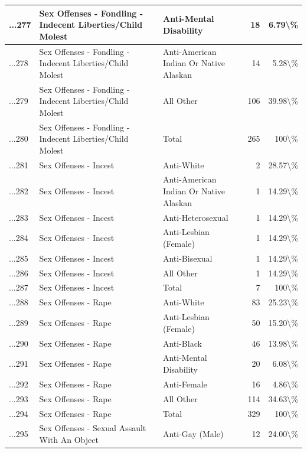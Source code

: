 \documentclass[
]{krantz}
\begin{document}
\begin{longtable}[t]{l|l|l|r|r}
\hline
...277 & Sex Offenses - Fondling - Indecent Liberties/Child Molest & Anti-Mental Disability & 18 & 6.79\textbackslash{}\%\\
\hline
...278 & Sex Offenses - Fondling - Indecent Liberties/Child Molest & Anti-American Indian Or Native Alaskan & 14 & 5.28\textbackslash{}\%\\
\hline
...279 & Sex Offenses - Fondling - Indecent Liberties/Child Molest & All Other & 106 & 39.98\textbackslash{}\%\\
\hline
...280 & Sex Offenses - Fondling - Indecent Liberties/Child Molest & Total & 265 & 100\textbackslash{}\%\\
\hline
...281 & Sex Offenses - Incest & Anti-White & 2 & 28.57\textbackslash{}\%\\
\hline
...282 & Sex Offenses - Incest & Anti-American Indian Or Native Alaskan & 1 & 14.29\textbackslash{}\%\\
\hline
...283 & Sex Offenses - Incest & Anti-Heterosexual & 1 & 14.29\textbackslash{}\%\\
\hline
...284 & Sex Offenses - Incest & Anti-Lesbian (Female) & 1 & 14.29\textbackslash{}\%\\
\hline
...285 & Sex Offenses - Incest & Anti-Bisexual & 1 & 14.29\textbackslash{}\%\\
\hline
...286 & Sex Offenses - Incest & All Other & 1 & 14.29\textbackslash{}\%\\
\hline
...287 & Sex Offenses - Incest & Total & 7 & 100\textbackslash{}\%\\
\hline
...288 & Sex Offenses - Rape & Anti-White & 83 & 25.23\textbackslash{}\%\\
\hline
...289 & Sex Offenses - Rape & Anti-Lesbian (Female) & 50 & 15.20\textbackslash{}\%\\
\hline
...290 & Sex Offenses - Rape & Anti-Black & 46 & 13.98\textbackslash{}\%\\
\hline
...291 & Sex Offenses - Rape & Anti-Mental Disability & 20 & 6.08\textbackslash{}\%\\
\hline
...292 & Sex Offenses - Rape & Anti-Female & 16 & 4.86\textbackslash{}\%\\
\hline
...293 & Sex Offenses - Rape & All Other & 114 & 34.63\textbackslash{}\%\\
\hline
...294 & Sex Offenses - Rape & Total & 329 & 100\textbackslash{}\%\\
\hline
...295 & Sex Offenses - Sexual Assault With An Object & Anti-Gay (Male) & 12 & 24.00\textbackslash{}\%\\
\hline

\end{longtable}
\end{document}
